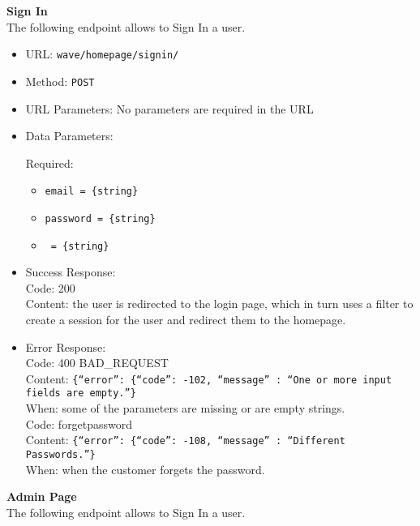 \noindent\textbf{Sign In}\\
The following endpoint allows to Sign In a user.

\begin{itemize}
    \item URL: \texttt{wave/homepage/signin/}
    \item Method: \texttt{POST}
    \item URL Parameters: No parameters are required in the URL
    \item Data Parameters:
    
    Required:
    
    \begin{itemize}
        \item \texttt{email = \{string\}}
        \item \texttt{password = \{string\}}
        \item \texttt{ = \{string\}}
    \end{itemize}
    
    
    \item Success Response:\\
    
    Code: 200\\
    Content: the user is redirected to the login page, which in turn uses a filter to create a session for the user and redirect them to the homepage.\\

    \item Error Response:\\
    
    Code: 400 BAD\_REQUEST\\
    Content: \texttt{\{``error'': \{``code'': -102, ``message'' : ``One or more input fields are empty.''\}}\\
    When: some of the parameters are missing or are empty strings.\\

    Code:  forgetpassword\\
    Content: \texttt{\{``error'': \{``code'': -108, ``message'' : ``Different Passwords.''\}}\\
    When: when the customer forgets the password.\\


    
\end{itemize}

\noindent\textbf{Admin Page}\\
The following endpoint allows to Sign In a user.

